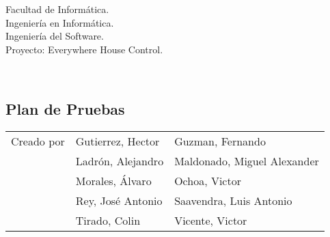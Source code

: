 \begin{titlepage}
    \begin{scriptsize}\noindent Facultad de Informática.\\
        Ingeniería en Informática.\\
        Ingeniería del Software.\\
        Proyecto: Everywhere House Control.
    \end{scriptsize}\\
    \vfill
    \begin{center}
        \begin{Large}
            \chapter{Plan de Pruebas}%
        \end{Large}
    \end{center}
    \vfill
    \begin{flushright}
        \begin{scriptsize}
            \begin{tabular}{lll}
                Creado por & Gutierrez, Hector & Guzman, Fernando  \\
                & Ladrón, Alejandro & Maldonado, Miguel Alexander \\
                & Morales, Álvaro & Ochoa, Victor \\
                & Rey, José Antonio & Saavendra, Luis Antonio  \\
                & Tirado, Colin & Vicente, Victor \\
            \end{tabular}
        \end{scriptsize}
    \end{flushright}
\end{titlepage}
\thispagestyle{empty}
\cleardoublepage
\newpage

\tableofcontents
\newpage
\thispagestyle{empty}
\cleardoublepage
\newpage
{}
\raggedbottom
{}







